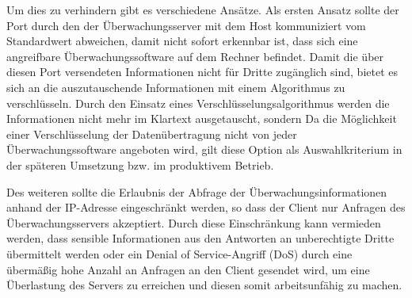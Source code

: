 Um dies zu verhindern gibt es verschiedene Ansätze.
Als ersten Ansatz sollte der Port durch den der Überwachungsserver mit dem Host kommuniziert vom Standardwert abweichen, damit nicht sofort erkennbar ist, dass sich eine angreifbare Überwachungssoftware auf dem Rechner befindet.\label{changeport}
Damit die über diesen Port versendeten Informationen nicht für Dritte zugänglich sind, bietet es sich an die auszutauschende Informationen mit einem Algorithmus zu verschlüsseln.
Durch den Einsatz eines Verschlüsselungsalgorithmus werden die Informationen nicht mehr im Klartext ausgetauscht, sondern
Da die Möglichkeit einer Verschlüsselung der Datenübertragung nicht von jeder Überwachungssoftware angeboten wird, gilt diese Option als Auswahlkriterium in der späteren Umsetzung bzw. im produktivem Betrieb.

Des weiteren sollte die Erlaubnis der Abfrage der Überwachungsinformationen anhand der \gls{IP}-Adresse eingeschränkt werden, so dass der Client nur Anfragen des Überwachungsservers akzeptiert.
Durch diese Einschränkung kann vermieden werden, dass sensible Informationen aus den Antworten an unberechtigte Dritte übermittelt werden oder ein Denial of Service-Angriff (\gls{DoS}) durch eine übermäßig hohe Anzahl an Anfragen an den Client gesendet wird, um eine Überlastung des Servers zu erreichen und diesen somit arbeitsunfähig zu machen.





























